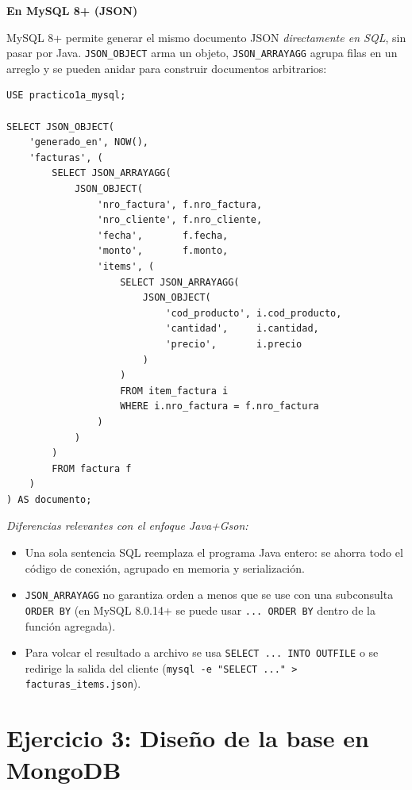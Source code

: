 \documentclass[11pt,a4paper]{article}
\newcommand{\itemcabecera}[1]{\noindent\textbf{#1}\par\medskip}
\newcommand{\bloqueMySQL}{\itemcabecera{En MySQL 8+ (JSON)}}
\begin{document}
\bloqueMySQL

MySQL 8+ permite generar el mismo documento JSON \emph{directamente en SQL}, sin pasar por Java. \texttt{JSON\_OBJECT} arma un objeto, \texttt{JSON\_ARRAYAGG} agrupa filas en un arreglo y se pueden anidar para construir documentos arbitrarios:

\begin{lstlisting}[style=sqlstyle]
USE practico1a_mysql;

SELECT JSON_OBJECT(
    'generado_en', NOW(),
    'facturas', (
        SELECT JSON_ARRAYAGG(
            JSON_OBJECT(
                'nro_factura', f.nro_factura,
                'nro_cliente', f.nro_cliente,
                'fecha',       f.fecha,
                'monto',       f.monto,
                'items', (
                    SELECT JSON_ARRAYAGG(
                        JSON_OBJECT(
                            'cod_producto', i.cod_producto,
                            'cantidad',     i.cantidad,
                            'precio',       i.precio
                        )
                    )
                    FROM item_factura i
                    WHERE i.nro_factura = f.nro_factura
                )
            )
        )
        FROM factura f
    )
) AS documento;
\end{lstlisting}

\textit{Diferencias relevantes con el enfoque Java+Gson:}

\begin{itemize}
    \item Una sola sentencia SQL reemplaza el programa Java entero: se ahorra todo el código de conexión, agrupado en memoria y serialización.
    \item \texttt{JSON\_ARRAYAGG} no garantiza orden a menos que se use con una subconsulta \texttt{ORDER BY} (en MySQL 8.0.14+ se puede usar \texttt{... ORDER BY} dentro de la función agregada).
    \item Para volcar el resultado a archivo se usa \texttt{SELECT ... INTO OUTFILE} o se redirige la salida del cliente (\texttt{mysql -e "SELECT ..."  > facturas\_items.json}).
\end{itemize}

\section{Ejercicio 3: Diseño de la base en MongoDB}
\end{document}

